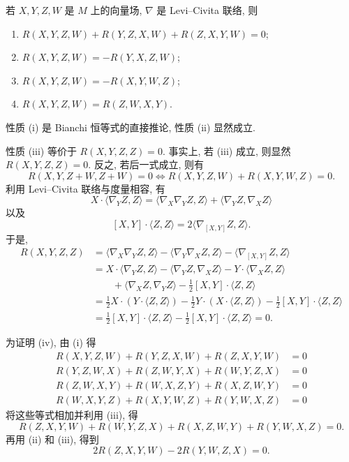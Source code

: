 \begin{RiemannProposition}\label{prop:symmetries-of-riemannian-curvature-tensor}
若 $X,Y,Z,W$ 是 $M$ 上的向量场, $\nabla$ 是 Levi–Civita 联络, 则
\begin{enumerate}[label=(\roman*),leftmargin=*]
\item $R(X,Y,Z,W)+R(Y,Z,X,W)+R(Z,X,Y,W)=0$;
\item $R(X,Y,Z,W)=-R(Y,X,Z,W)$;
\item $R(X,Y,Z,W)=-R(X,Y,W,Z)$;
\item $R(X,Y,Z,W)=R(Z,W,X,Y)$.
\end{enumerate}
\end{RiemannProposition}

\begin{RiemannProof}
性质 (i) 是 Bianchi 恒等式的直接推论, 性质 (ii) 显然成立.

性质 (iii) 等价于 $R(X,Y,Z,Z)=0$. 事实上, 若 (iii) 成立, 则显然 $R(X,Y,Z,Z)=0$. 反之, 若后一式成立, 则有
\[
  R(X,Y,Z+W,Z+W)=0\Leftrightarrow R(X,Y,Z,W)+R(X,Y,W,Z)=0.
\]
利用 Levi–Civita 联络与度量相容, 有
\[
  X\cdot\langle\nabla_YZ,Z\rangle
  =\langle\nabla_X\nabla_YZ,Z\rangle+\langle\nabla_YZ,\nabla_XZ\rangle
\]
以及
\[
  [X,Y]\cdot\langle Z,Z\rangle=2\bigl\langle\nabla_{[X,Y]}Z,Z\bigr\rangle.
\]
于是,
\begin{align*}
  R(X,Y,Z,Z)
  &=\langle\nabla_X\nabla_YZ,Z\rangle-\langle\nabla_Y\nabla_XZ,Z\rangle
    -\langle\nabla_{[X,Y]}Z,Z\rangle\\
  &=X\cdot\langle\nabla_YZ,Z\rangle-\langle\nabla_YZ,\nabla_XZ\rangle
    -Y\cdot\langle\nabla_XZ,Z\rangle\\
  &\qquad{}+\langle\nabla_XZ,\nabla_YZ\rangle-\tfrac12[X,Y]\cdot\langle Z,Z\rangle\\
  &=\tfrac12X\cdot(Y\cdot\langle Z,Z\rangle)-\tfrac12Y\cdot(X\cdot\langle Z,Z\rangle)
    -\tfrac12[X,Y]\cdot\langle Z,Z\rangle\\
  &=\tfrac12[X,Y]\cdot\langle Z,Z\rangle-\tfrac12[X,Y]\cdot\langle Z,Z\rangle=0.
\end{align*}

为证明 (iv), 由 (i) 得
\begin{align*}
  R(X,Y,Z,W)+R(Y,Z,X,W)+R(Z,X,Y,W)&=0\\
  R(Y,Z,W,X)+R(Z,W,Y,X)+R(W,Y,Z,X)&=0\\
  R(Z,W,X,Y)+R(W,X,Z,Y)+R(X,Z,W,Y)&=0\\
  R(W,X,Y,Z)+R(X,Y,W,Z)+R(Y,W,X,Z)&=0
\end{align*}
将这些等式相加并利用 (iii), 得
\[
  R(Z,X,Y,W)+R(W,Y,Z,X)+R(X,Z,W,Y)+R(Y,W,X,Z)=0.
\]
再用 (ii) 和 (iii), 得到
\[
  2R(Z,X,Y,W)-2R(Y,W,Z,X)=0.
\]
\end{RiemannProof}

